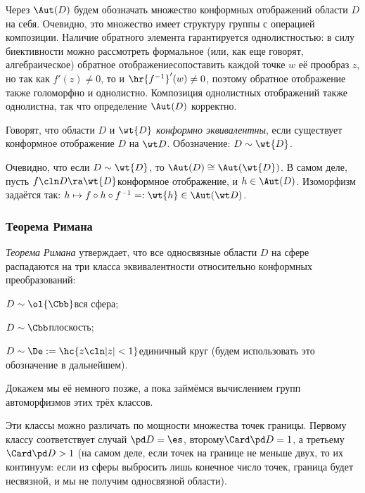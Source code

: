 \documentclass[a4paper]{article}
\begin{document}
Через $\Aut(D)$ будем обозначать множество конформных отображений области $D$ на себя.
Очевидно, это множество имеет структуру группы с операцией композиции.
Наличие обратного элемента гарантируется однолистностью: в силу биективности можно рассмотреть
формальное (или, как еще говорят, алгебраическое) обратное отображение\т сопоставить каждой точке
$w$ её прообраз $z$, но так как $f'(z)\neq 0$, то и $\hr{f^{-1}}'(w) \neq 0$, поэтому обратное отображение
также голоморфно и однолистно. Композиция однолистных отображений также однолистна, так что определение $\Aut(D)$
корректно.

\begin{df}
Говорят, что области $D$ и $\wt{D}$ \emph{конформно эквивалентны}, если существует конформное
отображение $D$ на $\wt D$. Обозначение: $D \sim \wt{D}$.
\end{df}

Очевидно, что если $D \sim \wt{D}$, то $\Aut(D) \cong \Aut(\wt{D})$. В самом деле, пусть $f\cln D\ra \wt{D}$\т конформное
отображение, и $h \in \Aut(D)$. Изоморфизм задаётся так: $h \mapsto f \circ h \circ f^{-1} = :\wt{h} \in \Aut(\wt D)$.

\subsubsection{Теорема Римана}

\emph{Теорема Римана} утверждает, что все односвязные области $D$ на сфере распадаются на три класса эквивалентности
относительно конформных преобразований:

\begin{items}{-2}
\item $D \sim \ol{\Cbb}$\т вся сфера;
\item $D \sim \Cbb$\т плоскость;
\item $D \sim \De := \hc{z\cln |z|<1}$\т единичный круг (будем использовать это обозначение в дальнейшем).
\end{items}

Докажем мы её немного позже, а пока займёмся вычислением групп автоморфизмов этих трёх классов.

Эти классы можно различать по мощности множества точек границы. Первому классу соответствует случай $\pd D = \es$,
второму\т $\Card \pd D = 1$, а третьему\т $\Card \pd D > 1$ (на самом деле, если точек на границе не меньше двух,
то их континуум: если из сферы выбросить лишь конечное число точек, граница  будет несвязной, и мы не получим
односвязной области).
\end{document}
